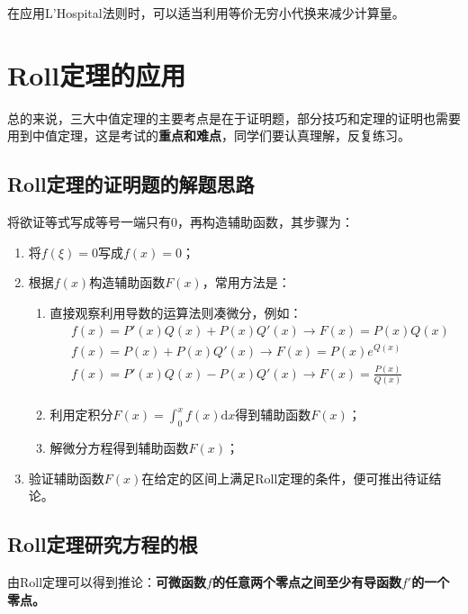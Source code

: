\begin{remark}
	在应用L'Hospital法则时，可以适当利用等价无穷小代换来减少计算量。
\end{remark}

\section{Roll定理的应用}\label{sec:4.5}
总的来说，三大中值定理的主要考点是在于证明题，部分技巧和定理的证明也需要用到中值定理，这是考试的\textbf{重点和难点}，同学们要认真理解，反复练习。

\subsection{Roll定理的证明题的解题思路}\label{sec:4.5.1}

将欲证等式写成等号一端只有0，再构造辅助函数，其步骤为：
\begin{enumerate}
	\item 将$f(\xi)=0$写成$f(x)=0$；
	\item 根据$f(x)$构造辅助函数$F(x)$，常用方法是：
	\begin{enumerate}[label=(\arabic*)]
		\item 直接观察利用导数的运算法则凑微分，例如：
		\begin{align*}
			&f(x)=P'(x)Q(x)+P(x)Q'(x)\to F(x)=P(x)Q(x)\\
			&f(x)=P(x)+P(x)Q'(x)\to F(x)=P(x)e^{Q(x)}\\
			&f(x)=P'(x)Q(x)-P(x)Q'(x)\to F(x)=\frac{P(x)}{Q(x)}\\
		\end{align*}
		\item 利用定积分$F(x)=\int ^x_0f(x)\mathrm{d}x$得到辅助函数$F(x)$；
		\item 解微分方程得到辅助函数$F(x)$；
	\end{enumerate}
    \item 验证辅助函数$F(x)$在给定的区间上满足Roll定理的条件，便可推出待证结论。
\end{enumerate}

\subsection{Roll定理研究方程的根}\label{sec:4.5.2}

由Roll定理可以得到推论：\textbf{可微函数$f$的任意两个零点之间至少有导函数$f'$的一个零点。}

